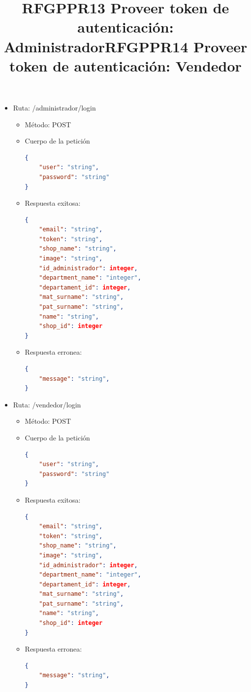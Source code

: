 \title{\textbf{RFGPPR13 Proveer token de autenticación: Administrador}}
\begin{itemize}
\item Ruta: /administrador/login
\begin{itemize}
\item Método: POST
\item Cuerpo de la petición
\begin{lstlisting}[language=json,firstnumber=1]
{
	"user": "string",
	"password": "string"
}
\end{lstlisting}
\item Respuesta exitosa:
\begin{lstlisting}[language=json,firstnumber=1]
{
    "email": "string",
    "token": "string",
    "shop_name": "string",
    "image": "string",
    "id_administrador": integer,
    "department_name": "integer",
    "departament_id": integer,
    "mat_surname": "string",
    "pat_surname": "string",
    "name": "string",
    "shop_id": integer
}
\end{lstlisting}

\item Respuesta erronea:
\begin{lstlisting}[language=json,firstnumber=1]
{
    "message": "string",
}
\end{lstlisting}
\end{itemize}
\end{itemize}

\title{\textbf{RFGPPR14 Proveer token de autenticación: Vendedor}}
\begin{itemize}
\item Ruta: /vendedor/login
\begin{itemize}
\item Método: POST
\item Cuerpo de la petición
\begin{lstlisting}[language=json,firstnumber=1]
{
	"user": "string",
	"password": "string"
}
\end{lstlisting}
\item Respuesta exitosa:
\begin{lstlisting}[language=json,firstnumber=1]
{
    "email": "string",
    "token": "string",
    "shop_name": "string",
    "image": "string",
    "id_administrador": integer,
    "department_name": "integer",
    "departament_id": integer,
    "mat_surname": "string",
    "pat_surname": "string",
    "name": "string",
    "shop_id": integer
}
\end{lstlisting}

\item Respuesta erronea:
\begin{lstlisting}[language=json,firstnumber=1]
{
    "message": "string",
}
\end{lstlisting}
\end{itemize}
\end{itemize}

